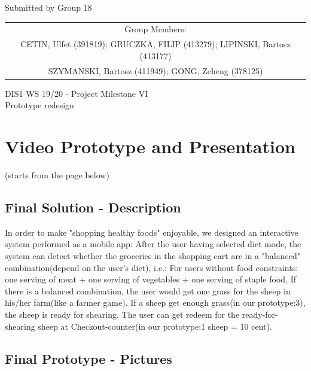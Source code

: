 \documentclass[a4paper,10pt,oneside]{scrreprt}
\begin{document}
\begin{center}
	Submitted by Group 18

	\bigskip

	\begin{tabular}{c}
	Group Members: \\
	CETIN, Ulfet (391819); GRUCZKA, FILIP (413279);	LIPINSKI, Bartosz (413177) \\
	SZYMANSKI, Bartosz (411949); GONG, Zeheng (378125)\\
	\end{tabular}

	\bigskip

	DIS1 WS 19/20 - Project Milestone VI\\
	Prototype redesign\\

\end{center}
\vspace{-1cm}


\begingroup
\let\clearpage\relax
	\chapter{Video Prototype and Presentation}
\endgroup

\begin{center}
	(starts from the page below)
\end{center}

\clearpage

\section{Final Solution - Description}
In order to make "shopping healthy foods" enjoyable, we designed an interactive system performed as a mobile app: After the user having selected diet mode, the system can detect whether the groceries in the shopping cart are in a "balanced" combination(depend on the user's diet), i.e.: For users without food constraints: one serving of meat + one serving of vegetables + one serving of staple food. If there is a balanced combination, the user would get one grass for the sheep in his/her farm(like a farmer game). If a sheep get enough grass(in our prototype:3), the sheep is ready for shearing. The user can get redeem for the ready-for-shearing sheep at Checkout-counter(in our prototype:1 sheep = 10 cent).

\section{Final Prototype - Pictures}
\end{document}
